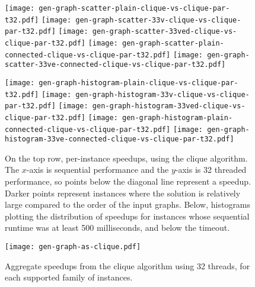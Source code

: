 \documentclass[sigconf]{acmart}
\begin{document}
\begin{figure*}[tb]
    \texttt{[image: gen-graph-scatter-plain-clique-vs-clique-par-t32.pdf]}
    \hfill
    \texttt{[image: gen-graph-scatter-33v-clique-vs-clique-par-t32.pdf]}
    \hfill
    \texttt{[image: gen-graph-scatter-33ved-clique-vs-clique-par-t32.pdf]}
    \hfill
    \texttt{[image: gen-graph-scatter-plain-connected-clique-vs-clique-par-t32.pdf]}
    \hfill
    \texttt{[image: gen-graph-scatter-33ve-connected-clique-vs-clique-par-t32.pdf]}

    \vspace*{1em}

    \texttt{[image: gen-graph-histogram-plain-clique-vs-clique-par-t32.pdf]}
    \hfill
    \texttt{[image: gen-graph-histogram-33v-clique-vs-clique-par-t32.pdf]}
    \hfill
    \texttt{[image: gen-graph-histogram-33ved-clique-vs-clique-par-t32.pdf]}
    \hfill
    \texttt{[image: gen-graph-histogram-plain-connected-clique-vs-clique-par-t32.pdf]}
    \hfill
    \texttt{[image: gen-graph-histogram-33ve-connected-clique-vs-clique-par-t32.pdf]}

    \caption{On the top row, per-instance speedups, using the clique algorithm. The $x$-axis is
    sequential performance and the $y$-axis is 32 threaded performance, so points below the diagonal
    line represent a speedup. Darker points represent instances where the solution is relatively
    large compared to the order of the input graphs. Below, histograms plotting the distribution of
    speedups for instances whose sequential runtime was at least 500 milliseconds, and below the
    timeout.}
\end{figure*}

\begin{figure}[tb]
    \texttt{[image: gen-graph-as-clique.pdf]}

    \caption{Aggregate speedups from the clique algorithm using 32 threads, for each supported
    family of instances.}
\end{figure}
\end{document}
